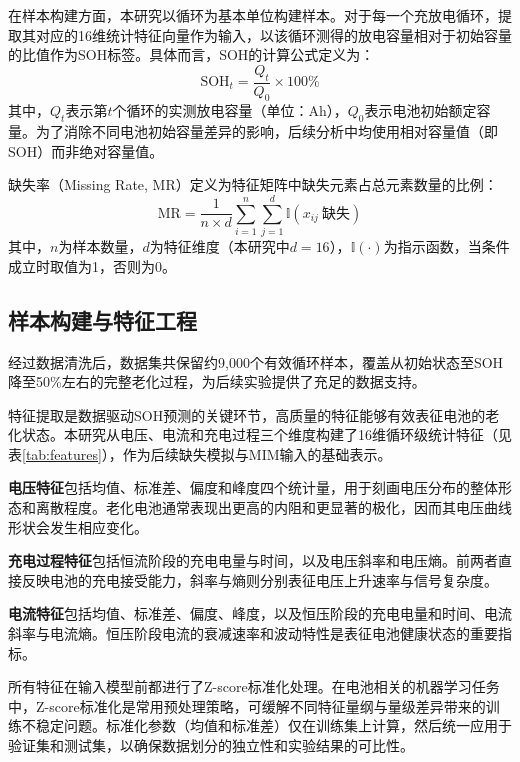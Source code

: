 \documentclass[10pt,a4paper]{ctexart}
\begin{document}
在样本构建方面，本研究以循环为基本单位构建样本。对于每一个充放电循环，提取其对应的16维统计特征向量作为输入，以该循环测得的放电容量相对于初始容量的比值作为SOH标签。具体而言，SOH的计算公式定义为：
\begin{equation}
    \text{SOH}_t = \frac{Q_t}{Q_0} \times 100\%
\end{equation}
其中，$Q_t$表示第$t$个循环的实测放电容量（单位：Ah），$Q_0$表示电池初始额定容量。为了消除不同电池初始容量差异的影响，后续分析中均使用相对容量值（即SOH）而非绝对容量值。

缺失率（Missing Rate, MR）定义为特征矩阵中缺失元素占总元素数量的比例：
\begin{equation}
    \text{MR} = \frac{1}{n \times d} \sum_{i=1}^{n}\sum_{j=1}^{d} \mathbb{I}(x_{ij}\ \text{缺失})
    \label{eq:mr}
\end{equation}
其中，$n$为样本数量，$d$为特征维度（本研究中$d=16$），$\mathbb{I}(\cdot)$为指示函数，当条件成立时取值为1，否则为0。

\subsection{样本构建与特征工程}

经过数据清洗后，数据集共保留约9,000个有效循环样本，覆盖从初始状态至SOH降至50\%左右的完整老化过程，为后续实验提供了充足的数据支持。

特征提取是数据驱动SOH预测的关键环节，高质量的特征能够有效表征电池的老化状态\cite{sun2025batteryhealth,wang2022chargingfeatures}。本研究从电压、电流和充电过程三个维度构建了16维循环级统计特征（见表\ref{tab:features}），作为后续缺失模拟与MIM输入的基础表示。

\textbf{电压特征}包括均值、标准差、偏度和峰度四个统计量，用于刻画电压分布的整体形态和离散程度。老化电池通常表现出更高的内阻和更显著的极化，因而其电压曲线形状会发生相应变化。

\textbf{充电过程特征}包括恒流阶段的充电电量与时间，以及电压斜率和电压熵。前两者直接反映电池的充电接受能力，斜率与熵则分别表征电压上升速率与信号复杂度。

\textbf{电流特征}包括均值、标准差、偏度、峰度，以及恒压阶段的充电电量和时间、电流斜率与电流熵。恒压阶段电流的衰减速率和波动特性是表征电池健康状态的重要指标。

所有特征在输入模型前都进行了Z-score标准化处理。在电池相关的机器学习任务中，Z-score标准化是常用预处理策略，可缓解不同特征量纲与量级差异带来的训练不稳定问题\cite{xue2024batteryml}。标准化参数（均值和标准差）仅在训练集上计算，然后统一应用于验证集和测试集，以确保数据划分的独立性和实验结果的可比性。
\end{document}
